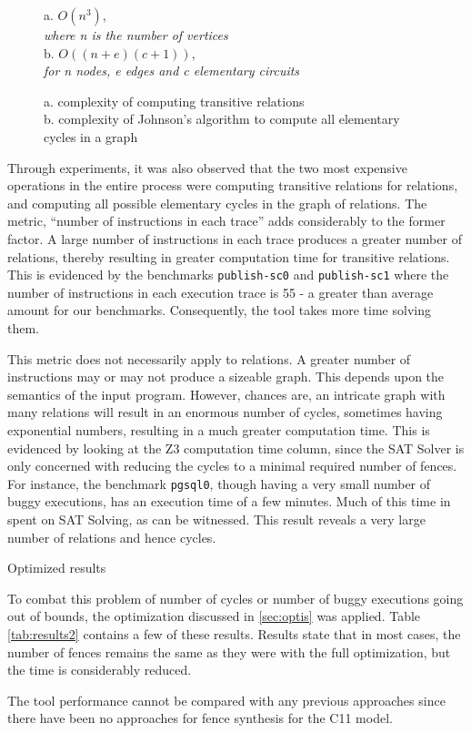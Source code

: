 \begin{figure}
	a. $O(n^3)$, \\
	\textit{where n is the number of vertices}\\
	
	
	b. $O((n+e)(c+1))$, \\
	\textit{for n nodes, e edges and c elementary circuits}
	\caption{a. complexity of computing transitive \setHB relations\\
	b. complexity of Johnson's algorithm to compute all elementary cycles in a graph}
\end{figure}

Through experiments, it was also observed that the two most expensive 
operations in the entire process were computing transitive relations for \setHB 
relations, and computing all possible elementary cycles in the graph of \setTO
relations. The metric, ``number of instructions in each trace'' adds
considerably to the former factor. A large number of instructions in each
trace produces a greater number of \setHB relations, thereby resulting in
greater computation time for transitive relations. This is evidenced by the benchmarks
\texttt{publish-sc0} and \texttt{publish-sc1} where the number of instructions in each
execution trace is 55 - a greater than average amount for our benchmarks.
Consequently, the tool takes more time solving them.

This metric does not necessarily apply to \setTO relations.
A greater number of instructions may or may not produce a sizeable \setTO graph.
This depends upon the semantics of the input program. However, chances are,
an intricate graph with many \setTO relations will result in an enormous number of cycles, 
sometimes having exponential numbers, resulting in a much greater
computation time. This is evidenced by looking at the Z3 computation 
time column, since the SAT Solver is only concerned with reducing the cycles
to a minimal required number of fences. For instance, the benchmark \texttt{pgsql0}, though having 
a very small number of buggy executions, has an execution time of a few minutes. Much
of this time in spent on SAT Solving, as can be witnessed. This result reveals 
a very large number of \setTO relations and hence cycles.

\begin{table}
\begin{center}
	
	\caption{Optimized results}
	\label{tab:results2}
\end{center}
\end{table}

To combat this problem of number of cycles or number of buggy executions going out of bounds,
the optimization discussed in \ref{sec:optis} was applied.
Table \ref{tab:results2} contains a few of these results. Results state that
in most cases, the number of fences remains the same as they were with the 
full optimization, but the time is considerably reduced.

The tool performance cannot be compared with any previous approaches since there have been no
approaches for fence synthesis for the C11 model.